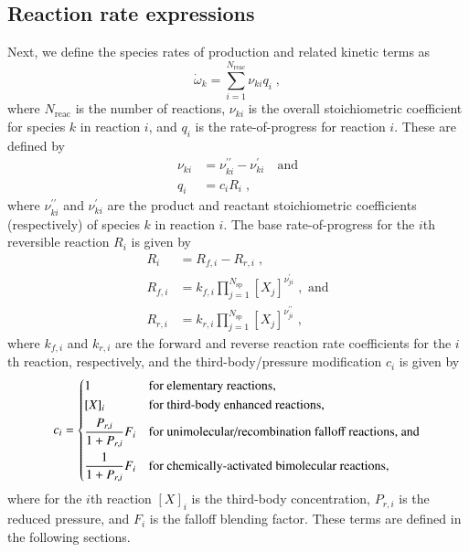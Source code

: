 \documentclass[preprint,12pt]{elsarticle}
\newcommand{ \numsp }{N_{\text{sp}}}
\begin{document}
\subsection{Reaction rate expressions}

Next, we define the species rates of production and related kinetic terms as
\begin{equation}
\dot{\omega}_k = \sum_{i=1}^{N_{\text{reac}}} \nu_{k i} q_i \;,
\end{equation}
where $N_{\text{reac}}$ is the number of reactions, $\nu_{k i}$ is the overall stoichiometric coefficient for species $k$ in reaction $i$, and $q_i$ is the rate-of-progress for reaction $i$.
These are defined by
\begin{align}
\nu_{k i} &= \nu_{k i}^{\prime \prime} - \nu_{k i}^{\prime}  \quad \text{and} \\
q_i &= c_i R_i \;,
\end{align}
where $\nu_{k i}^{\prime \prime}$ and $\nu_{k i}^{\prime}$ are the product and reactant stoichiometric coefficients (respectively) of species $k$ in reaction $i$.
The base rate-of-progress for the $i$th reversible reaction $R_i$ is given by
\begin{align}
R_i &= R_{f, i} - R_{r, i} \;, \\
R_{f, i} &= k_{f, i} \prod_{j = 1}^{\numsp} [X_j]^{\nu_{j i}^{\prime}} \;, \text{ and} \\
R_{r, i} &= k_{r, i} \prod_{j = 1}^{\numsp} [X_j]^{\nu_{j i}^{\prime \prime}} \;,
\end{align}
where $k_{f,i}$ and $k_{r,i}$ are the forward and reverse reaction rate coefficients for the $i$th reaction, respectively, and the third-body\slash pressure modification $c_i$ is given by
\begin{equation}
c_i = \begin{dcases}
  1 &\text{for elementary reactions,} \\
  [X]_i &\text{for third-body enhanced reactions,} \\
  \frac{P_{r,i}}{1 + P_{r,i}} F_i &\text{for unimolecular/recombination falloff reactions, and} \\
  \frac{1}{1 + P_{r,i}} F_i &\text{for chemically-activated bimolecular reactions,}
  \end{dcases}
\label{e:rxn_pressure}
\end{equation}
where for the $i$th reaction $[X]_i$ is the third-body concentration, $P_{r,i}$ is the reduced pressure, and $F_i$ is the falloff blending factor.
These terms are defined in the following sections.
\end{document}
